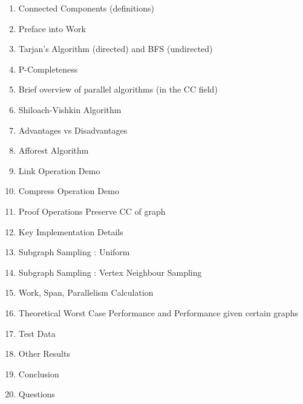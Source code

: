 \documentclass[a4paper,11pt]{article}
\title{}
\begin{document}
\maketitle

\begin{enumerate}
\item Connected Components (definitions)
\item Preface into Work
\item Tarjan's Algorithm (directed) and BFS (undirected) 
\item P-Completeness
\item Brief overview of parallel algorithms (in the CC field)
\item Shiloach-Vishkin Algorithm
\item Advantages vs Disadvantages 
\item Afforest Algorithm
\item Link Operation Demo
\item Compress Operation Demo
\item Proof Operations Preserve CC of graph
\item Key Implementation Details
\item Subgraph Sampling : Uniform
\item Subgraph Sampling : Vertex Neighbour Sampling
\item Work, Span, Parallelism Calculation 
\item Theoretical Worst Case Performance and Performance given certain graphs
\item Test Data
\item Other Results
\item Conclusion
\item Questions

\end{enumerate}
\end{document}

